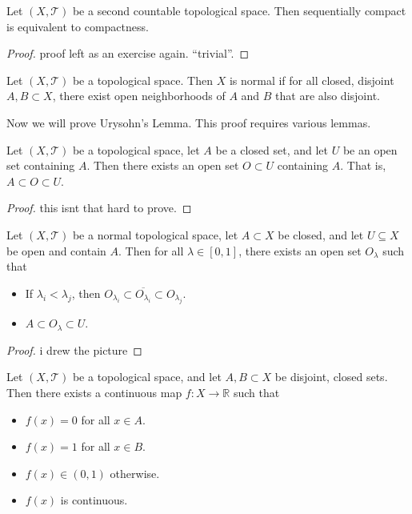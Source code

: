 \documentclass[11pt, letterpaper]{report}
\begin{document}
\begin{theorem}\label{thm:3}
	Let $(X,\mathcal{T} )$ be a second countable topological space. Then sequentially compact is equivalent to compactness.
\end{theorem}
\begin{proof}
	proof left as an exercise again. ``trivial''.
\end{proof}
\begin{definition}[Normal]\label{dfn:13}
	Let $(X,\mathcal{T} )$ be a topological space. Then $X$ is normal if for all closed, disjoint $A,B\subset X$, there exist open neighborhoods of $A$ and $B$ that are also disjoint.
\end{definition}
Now we will prove Urysohn's Lemma. This proof requires various lemmas.
\begin{lemma}\label{lma:1}
	Let $(X,\mathcal{T} )$ be a topological space, let $A$ be a closed set, and let $U$ be an open set containing $A$. Then there exists an open set $O\subset U$ containing $A$. That is, $A\subset O\subset U$.
\end{lemma}
\begin{proof}
	this isnt that hard to prove.
\end{proof}
\begin{lemma}\label{lma:2}
	Let $(X,\mathcal{T} )$ be a normal topological space, let $A\subset X$ be closed, and let $U\subseteq X$ be open and contain $A$. Then for all $\lambda \in [0,1]$, there exists an open set $O_{\lambda }$ such that
	\begin{itemize}
		\item If $\lambda_i<\lambda _j$, then $O_{\lambda _i}\subset \overline{O_{\lambda _i}} \subset O_{\lambda _j}$.
		\item $A\subset O_{\lambda }\subset U$.
	\end{itemize}
\end{lemma}
\begin{proof}
	i drew the picture
\end{proof}
\begin{theorem}\label{thm:4}
	Let $(X,\mathcal{T} )$ be a topological space, and let $A,B\subset X$ be disjoint, closed sets. Then there exists a continuous map $f : X \to \mathbb{R}$ such that
	\begin{itemize}
		\item $f(x)=0$ for all $x\in A$.
		\item $f(x)=1$ for all $x\in B$.
		\item $f(x)\in(0,1)$ otherwise.
		\item $f(x)$ is continuous.
	\end{itemize}
\end{theorem}
\end{document}

